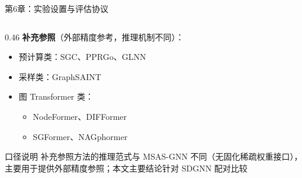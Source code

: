 \documentclass[aspectratio=169,9pt,xcolor=dvipsnames]{beamer}
\begin{document}
\begin{frame}{第6章：实验设置与评估协议}
\begin{columns}[T]
\begin{column}{0.46\textwidth}
      \vspace{0.15cm}
      \textbf{补充参照}（外部精度参考，推理机制不同）：
      \begin{itemize}
        \item 预计算类：SGC、PPRGo、GLNN
        \item 采样类：GraphSAINT
        \item 图 Transformer 类：
          \begin{itemize}
            \item NodeFormer、DIFFormer
            \item SGFormer、NAGphormer
          \end{itemize}
      \end{itemize}

      \vspace{0.15cm}
      \begin{alertblock}{口径说明}
        补充参照方法的推理范式与 MSAS-GNN 不同（无固化稀疏权重接口），主要用于提供外部精度参照；本文主要结论针对 SDGNN 配对比较
      \end{alertblock}
    \end{column}
  \end{columns}
\end{frame}
\end{document}
